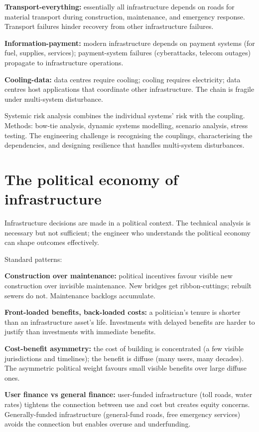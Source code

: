 \textbf{Transport-everything:} essentially all infrastructure depends on roads for material transport during construction, maintenance, and emergency response. Transport failures hinder recovery from other infrastructure failures.

\textbf{Information-payment:} modern infrastructure depends on payment systems (for fuel, supplies, services); payment-system failures (cyberattacks, telecom outages) propagate to infrastructure operations.

\textbf{Cooling-data:} data centres require cooling; cooling requires electricity; data centres host applications that coordinate other infrastructure. The chain is fragile under multi-system disturbance.

Systemic risk analysis combines the individual systems' risk with the coupling. Methods: bow-tie analysis, dynamic systems modelling, scenario analysis, stress testing. The engineering challenge is recognising the couplings, characterising the dependencies, and designing resilience that handles multi-system disturbances.

\section{The political economy of infrastructure}

Infrastructure decisions are made in a political context. The technical analysis is necessary but not sufficient; the engineer who understands the political economy can shape outcomes effectively.

Standard patterns:

\textbf{Construction over maintenance:} political incentives favour visible new construction over invisible maintenance. New bridges get ribbon-cuttings; rebuilt sewers do not. Maintenance backlogs accumulate.

\textbf{Front-loaded benefits, back-loaded costs:} a politician's tenure is shorter than an infrastructure asset's life. Investments with delayed benefits are harder to justify than investments with immediate benefits.

\textbf{Cost-benefit asymmetry:} the cost of building is concentrated (a few visible jurisdictions and timelines); the benefit is diffuse (many users, many decades). The asymmetric political weight favours small visible benefits over large diffuse ones.

\textbf{User finance vs general finance:} user-funded infrastructure (toll roads, water rates) tightens the connection between use and cost but creates equity concerns. Generally-funded infrastructure (general-fund roads, free emergency services) avoids the connection but enables overuse and underfunding.

